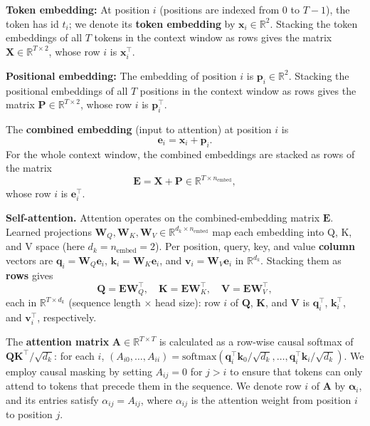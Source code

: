 \documentclass[
  11pt,
  a4paper,
]{article}
\begin{document}
\textbf{Token embedding:} At position \(i\) (positions are indexed from
\(0\) to \(T-1\)), the token has id \(t_i\); we denote its \textbf{token
embedding} by \(\mathbf{x}_i \in \mathbb{R}^2\). Stacking the token
embeddings of all \(T\) tokens in the context window as rows gives the
matrix \(\mathbf{X} \in \mathbb{R}^{T \times 2}\), whose row \(i\) is
\(\mathbf{x}_i^\top\).

\textbf{Positional embedding:} The embedding of position \(i\) is
\(\mathbf{p}_i \in \mathbb{R}^2\). Stacking the positional embeddings of
all \(T\) positions in the context window as rows gives the matrix
\(\mathbf{P} \in \mathbb{R}^{T \times 2}\), whose row \(i\) is
\(\mathbf{p}_i^\top\).

The \textbf{combined embedding} (input to attention) at position \(i\)
is \[
\mathbf{e}_i = \mathbf{x}_i + \mathbf{p}_i.
\] For the whole context window, the combined embeddings are stacked as
rows of the matrix \[
\mathbf{E} = \mathbf{X} + \mathbf{P} \in \mathbb{R}^{T \times n_{\mathrm{embed}}},
\] whose row \(i\) is \(\mathbf{e}_i^\top\).

\textbf{Self-attention.} Attention operates on the combined-embedding
matrix \(\mathbf{E}\). Learned projections
\(\mathbf{W}_Q, \mathbf{W}_K, \mathbf{W}_V \in \mathbb{R}^{d_k \times n_{\mathrm{embed}}}\)
map each embedding into Q, K, and V space (here
\(d_k = n_{\mathrm{embed}} = 2\)). Per position, query, key, and value
\textbf{column} vectors are
\(\mathbf{q}_i = \mathbf{W}_Q \mathbf{e}_i\),
\(\mathbf{k}_i = \mathbf{W}_K \mathbf{e}_i\), and
\(\mathbf{v}_i = \mathbf{W}_V \mathbf{e}_i\) in \(\mathbb{R}^{d_k}\).
Stacking them as \textbf{rows} gives \[
\mathbf{Q} = \mathbf{E} \mathbf{W}_Q^\top, \quad \mathbf{K} = \mathbf{E} \mathbf{W}_K^\top, \quad \mathbf{V} = \mathbf{E} \mathbf{W}_V^\top,
\] each in \(\mathbb{R}^{T \times d_k}\) (sequence length \(\times\)
head size): row \(i\) of \(\mathbf{Q}\), \(\mathbf{K}\), and
\(\mathbf{V}\) is \(\mathbf{q}_i^\top\), \(\mathbf{k}_i^\top\), and
\(\mathbf{v}_i^\top\), respectively.

The \textbf{attention matrix} \(\mathbf{A} \in \mathbb{R}^{T \times T}\)
is calculated as a row-wise causal softmax of
\(\mathbf{Q}\mathbf{K}^\top/\sqrt{d_k}\): for each \(i\),
\((A_{i0},\ldots,A_{ii}) = \mathrm{softmax}(\mathbf{q}_i^\top\mathbf{k}_0/\sqrt{d_k},\ldots,\mathbf{q}_i^\top\mathbf{k}_i/\sqrt{d_k})\).
We employ causal masking by setting \(A_{ij}=0\) for \(j>i\) to ensure
that tokens can only attend to tokens that precede them in the sequence.
We denote row \(i\) of \(\mathbf{A}\) by \(\boldsymbol{\alpha}_i\), and
its entries satisfy \(\alpha_{ij}=A_{ij}\), where \(\alpha_{ij}\) is the
attention weight from position \(i\) to position \(j\).
\end{document}
